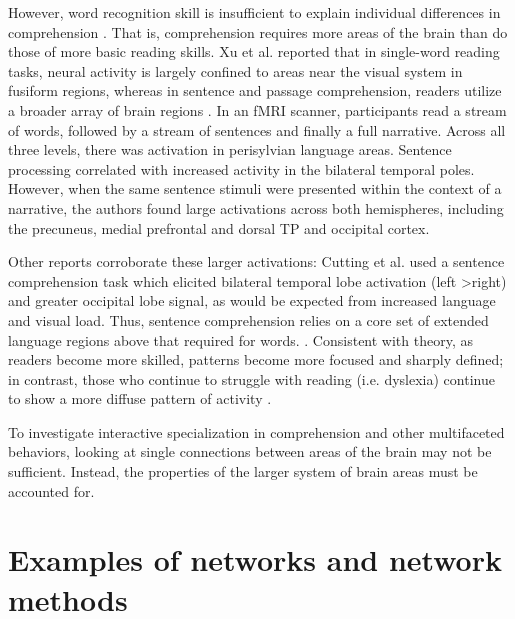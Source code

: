 However, word recognition skill is insufficient to explain individual differences in comprehension \cite{Gough1986, Hoover1990}. That is, comprehension requires more areas of the brain than do those of more basic reading skills. Xu et al. reported that in single-word reading tasks, neural activity is largely confined to areas near the visual system in fusiform regions, whereas in sentence and passage comprehension, readers utilize a broader array of brain regions \cite{Xu2005}. In an fMRI scanner, participants read a stream of words, followed by a stream of sentences and finally a full narrative. Across all three levels, there was activation in perisylvian language areas. Sentence processing correlated with increased activity in the bilateral temporal poles. However, when the same sentence stimuli were presented within the context of a narrative, the authors found large activations across both hemispheres, including the precuneus, medial prefrontal and dorsal TP and occipital cortex. 

Other reports corroborate these larger activations: Cutting et al. used a sentence comprehension task which elicited bilateral temporal lobe activation (left \textgreater right) and greater occipital lobe signal, as would be expected from increased language and visual load. Thus, sentence comprehension relies on a core set of extended language regions above that required for words.  \cite{Cutting2006a}. Consistent with theory, as readers become more skilled, patterns become more focused and sharply defined; in contrast, those who continue to struggle with reading (i.e. dyslexia) continue to show a more diffuse pattern of activity \cite{Rimrodt2009}. 

To investigate interactive specialization in comprehension and other multifaceted behaviors, looking at single connections between areas of the brain may not be sufficient. Instead, the properties of the larger system of brain areas must be accounted for. 

\section{Examples of networks and network methods}

